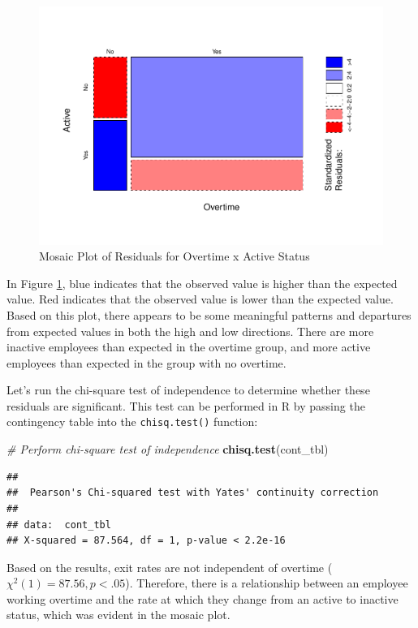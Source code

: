 \documentclass[]{book}
\newenvironment{Shaded}{\begin{snugshade}}{\end{snugshade}}
\newcommand{\CommentTok}[1]{\textcolor[rgb]{0.56,0.35,0.01}{\textit{#1}}}
\newcommand{\KeywordTok}[1]{\textcolor[rgb]{0.13,0.29,0.53}{\textbf{#1}}}
\newcommand{\NormalTok}[1]{#1}
\begin{document}
\begin{figure}

{\centering \includegraphics[width=0.75\linewidth]{People_Analytics_Lifecycle_files/figure-latex/mosaic-plot-1} 

}

\caption{Mosaic Plot of Residuals for Overtime x Active Status}\label{fig:mosaic-plot}
\end{figure}

In Figure \ref{fig:mosaic-plot}, blue indicates that the observed value is higher than the expected value. Red indicates that the observed value is lower than the expected value. Based on this plot, there appears to be some meaningful patterns and departures from expected values in both the high and low directions. There are more inactive employees than expected in the overtime group, and more active employees than expected in the group with no overtime.

Let's run the chi-square test of independence to determine whether these residuals are significant. This test can be performed in R by passing the contingency table into the \texttt{chisq.test()} function:

\begin{Shaded}
\begin{Highlighting}[]
\CommentTok{# Perform chi-square test of independence}
\KeywordTok{chisq.test}\NormalTok{(cont_tbl)}
\end{Highlighting}
\end{Shaded}

\begin{verbatim}
## 
##  Pearson's Chi-squared test with Yates' continuity correction
## 
## data:  cont_tbl
## X-squared = 87.564, df = 1, p-value < 2.2e-16
\end{verbatim}

Based on the results, exit rates are not independent of overtime (\({\chi}^2(1) = 87.56, p < .05\)). Therefore, there is a relationship between an employee working overtime and the rate at which they change from an active to inactive status, which was evident in the mosaic plot.
\end{document}

